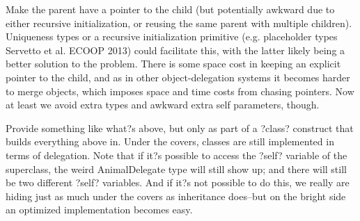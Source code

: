 \documentclass[preprint]{sigplanconf}
\begin{document}
Make the parent have a pointer to the child (but potentially awkward due to either recursive initialization, or reusing the same parent with multiple children).  Uniqueness types or a recursive initialization primitive (e.g. placeholder types Servetto et al. ECOOP 2013) could facilitate this, with the latter likely being a better solution to the problem.  There is some space cost in keeping an explicit pointer to the child, and as in other object-delegation systems it becomes harder to merge objects, which imposes space and time costs from chasing pointers.  Now at least we avoid extra types and awkward extra self parameters, though.

Provide something like what?s above, but only as part of a ?class? construct that builds everything above in.  Under the covers, classes are still implemented in terms of delegation.  Note that if it?s possible to access the ?self? variable of the superclass, the weird AnimalDelegate type will still show up; and there will still be two different ?self? variables.  And if it?s not possible to do this, we really are hiding just as much under the covers as inheritance does--but on the bright side an optimized implementation becomes easy.


%
%
%
%
\end{document}
